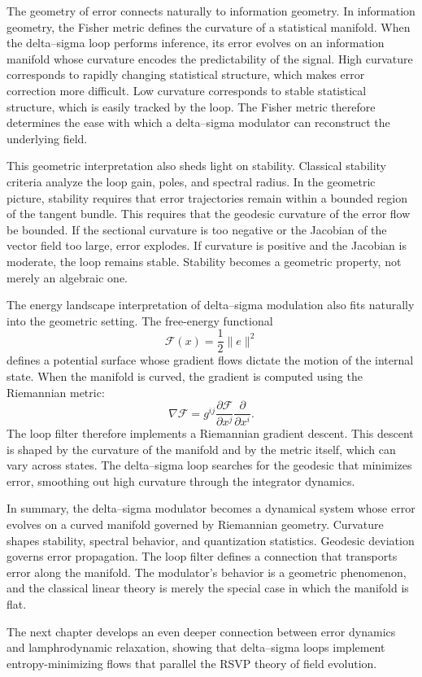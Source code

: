 The geometry of error connects naturally to information geometry. In information geometry, the Fisher metric defines the curvature of a statistical manifold. When the delta–sigma loop performs inference, its error evolves on an information manifold whose curvature encodes the predictability of the signal. High curvature corresponds to rapidly changing statistical structure, which makes error correction more difficult. Low curvature corresponds to stable statistical structure, which is easily tracked by the loop. The Fisher metric therefore determines the ease with which a delta–sigma modulator can reconstruct the underlying field.

This geometric interpretation also sheds light on stability. Classical stability criteria analyze the loop gain, poles, and spectral radius. In the geometric picture, stability requires that error trajectories remain within a bounded region of the tangent bundle. This requires that the geodesic curvature of the error flow be bounded. If the sectional curvature is too negative or the Jacobian of the vector field too large, error explodes. If curvature is positive and the Jacobian is moderate, the loop remains stable. Stability becomes a geometric property, not merely an algebraic one.

The energy landscape interpretation of delta–sigma modulation also fits naturally into the geometric setting. The free-energy functional
\[
\mathcal{F}(x) = \frac{1}{2} \| e \|^{2}
\]
defines a potential surface whose gradient flows dictate the motion of the internal state. When the manifold is curved, the gradient is computed using the Riemannian metric:
\[
\nabla \mathcal{F} = g^{ij} \frac{\partial \mathcal{F}}{\partial x^{j}} \frac{\partial}{\partial x^{i}}.
\]
The loop filter therefore implements a Riemannian gradient descent. This descent is shaped by the curvature of the manifold and by the metric itself, which can vary across states. The delta–sigma loop searches for the geodesic that minimizes error, smoothing out high curvature through the integrator dynamics.

In summary, the delta–sigma modulator becomes a dynamical system whose error evolves on a curved manifold governed by Riemannian geometry. Curvature shapes stability, spectral behavior, and quantization statistics. Geodesic deviation governs error propagation. The loop filter defines a connection that transports error along the manifold. The modulator’s behavior is a geometric phenomenon, and the classical linear theory is merely the special case in which the manifold is flat.

The next chapter develops an even deeper connection between error dynamics and lamphrodynamic relaxation, showing that delta–sigma loops implement entropy-minimizing flows that parallel the RSVP theory of field evolution.



